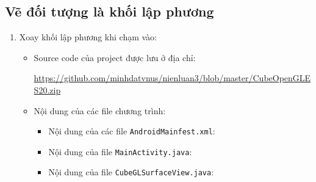 \documentclass[13pt,a4paper]{extreport}
\begin{document}
\subsection{Vẽ đối tượng là khối lập phương}
	\begin{enumerate}[{\it a.}]
		\item Xoay khối lập phương khi chạm vào:
			\begin{itemize}
				\item Source code của project được lưu ở địa chỉ: 
				
					\url{https://github.com/minhdatvnus/nienluan3/blob/master/CubeOpenGLES20.zip}
				
				\item Nội dung của các file chương trình:
					\begin{itemize}
						\item Nội dung của các file \verb|AndroidMainfest.xml|:
							
			
						\item Nội dung của file \verb|MainActivity.java|:
							
		
						\item Nội dung của file \verb|CubeGLSurfaceView.java|:
							
					\end{itemize}
		

\end{itemize}
\end{enumerate}
\end{document}
